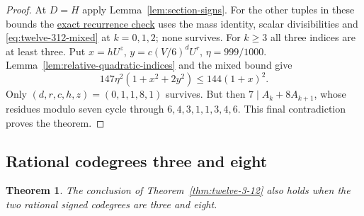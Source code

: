 \documentclass[11pt,reqno]{amsart}
\newcommand{\codecheck}[2]{\href{https://github.com/sebastienpalcoux/grothendieck-ring-classification/blob/d5750105bb5758f3ad38d2e5464dfcc12c019816/supplements/rank6/sphericality/#1}{#2}}
\newtheorem{theorem}{Theorem}[section]
\theoremstyle{remark}\newtheorem{remark}[theorem]{Remark}
\numberwithin{equation}{section}
\begin{document}
\begin{proof}
At $D=H$ apply Lemma~\ref{lem:section-signs}. For the other
tuples in these bounds the
\codecheck{twelve_three_twelve.py}{exact recurrence check}
uses the mass identity, scalar divisibilities and
\eqref{eq:twelve-312-mixed} at $k=0,1,2$; none survives.
For $k\ge3$ all three indices are at least three. Put
$x=hU^z$, $y=c(V/6)^dU^r$, $\eta=999/1000$.
Lemma~\ref{lem:relative-quadratic-indices} and the mixed bound give
\[
 147\eta^2(1+x^2+2y^2)\le144(1+x)^2 .
\]
Only $(d,r,c,h,z)=(0,1,1,8,1)$ survives. But then
$7\mid A_k+8A_{k+1}$, whose residues modulo seven cycle through
$6,4,3,1,1,3,4,6$. This final contradiction proves the theorem.
\end{proof}

\subsection{Rational codegrees three and eight}

\begin{theorem}\label{thm:twelve-3-8}
The conclusion of Theorem~\ref{thm:twelve-3-12} also holds when the two rational signed codegrees are three and eight.
\end{theorem}
\end{document}
